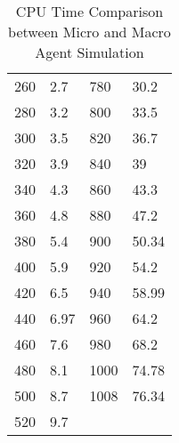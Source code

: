 \begin{table}
\begin{adjustbox}{angle=270}
{\begin{tabular}{|l|l|l|l|}
260      & 2.7                                                         & 780      & 30.2                                                         \\
280      & 3.2                                                         & 800      & 33.5                                                         \\
300      & 3.5                                                         & 820      & 36.7                                                         \\
320      & 3.9                                                         & 840      & 39                                                           \\
340      & 4.3                                                         & 860      & 43.3                                                         \\
360      & 4.8                                                         & 880      & 47.2                                                         \\
380      & 5.4                                                         & 900      & 50.34                                                        \\
400      & 5.9                                                         & 920      & 54.2                                                         \\
420      & 6.5                                                         & 940      & 58.99                                                        \\
440      & 6.97                                                        & 960      & 64.2                                                         \\
460      & 7.6                                                         & 980      & 68.2                                                         \\
480      & 8.1                                                         & 1000     & 74.78                                                        \\
500      & 8.7                                                         & 1008     & 76.34                                                        \\
520      & 9.7                                                         &          &                                                              \\
\hline
\end{tabular}}
\end{adjustbox}
\caption{CPU Time Comparison between Micro and Macro Agent Simulation}
\label{CPU Time Comparison between Micro and Macro Agent Simulation}
\end{table}  

